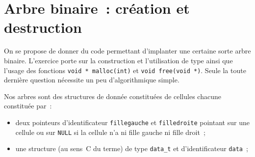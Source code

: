 \section{Arbre binaire~: cr\'eation et destruction}
\label{sec:ArbreBinaire}
On se propose de donner du code permettant d'implanter une certaine
sorte arbre binaire.  L'exercice porte sur la construction et
l'utilisation de type ainsi que l'usage des fonctions \verb+void * malloc(int)+ et
\verb+void free(void *)+. Seule la toute derni\`ere question n\'ecessite un peu
d'algorithmique simple.
\par
Nos arbres sont des structures de donn\'ee constitu\'ees de cellules
chacune constitu\'ee par~:
\begin{itemize}
\item deux pointeurs d'identificateur \verb+fillegauche+ et
  \verb+filledroite+ pointant sur une cellule ou sur \verb+NULL+ si la
  cellule n'a ni fille gauche ni fille droit~;
\item une structure (au sens~C du terme) de type \verb+data_t+ et
  d'identificateur \verb+data+~;
\end{itemize}
